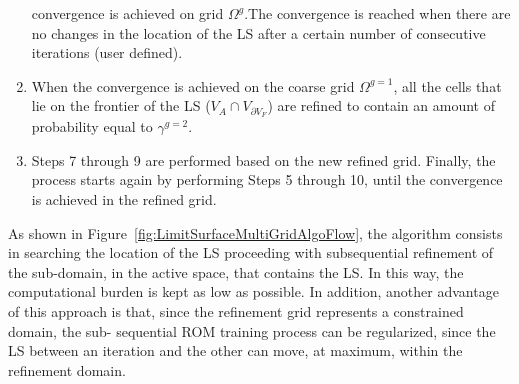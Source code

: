 \begin{enumerate}
     convergence is achieved on grid $\Omega^{g}$.The convergence
     is reached when there are no changes in the location of the LS
     after a certain number of consecutive iterations (user defined).
     \item When the convergence is achieved on the coarse grid
     $\Omega^{g=1}$, all the cells that lie on the frontier of the LS
     ($V_{A} \cap V_{\partial V_{F}}$) are refined to contain an amount of
     probability equal to  $\gamma^{g=2}$.
     \item Steps 7 through 9 are performed based on the new refined
     grid. Finally, the process starts again by performing Steps 5
     through 10, until the convergence is achieved in the refined grid.
\end{enumerate}
As shown in Figure~\ref{fig:LimitSurfaceMultiGridAlgoFlow}, the
algorithm consists in searching the location of the LS proceeding with
subsequential refinement of the sub-domain, in the active space, that
contains the LS. In this way, the computational burden is kept as low as
possible. In addition, another advantage of this approach is that, since
the refinement grid represents a constrained domain, the sub-
sequential ROM training process can be regularized, since the LS
between an iteration and the other can move, at maximum, within the
refinement domain.

